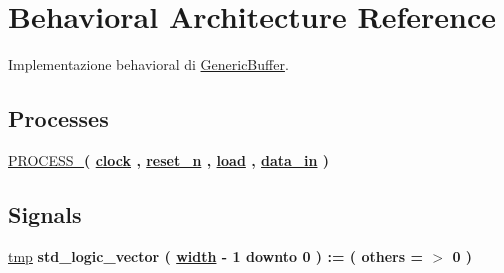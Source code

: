\hypertarget{class_generic_buffer_1_1_behavioral}{}\section{Behavioral Architecture Reference}
\label{class_generic_buffer_1_1_behavioral}


Implementazione behavioral di \hyperlink{class_generic_buffer}{Generic\+Buffer}.  


\subsection*{Processes}
 \begin{DoxyCompactItemize}
\item 
\hyperlink{group___generic_buffer_ga2ee480e118ca2b3fccf26139a66e84ad}{P\+R\+O\+C\+E\+S\+S\+\_}{\bfseries  ( {\bfseries {\bfseries \hyperlink{group___generic_buffer_gadfc2d5e995e9c6876b2e55bf6a5c4071}{clock}} \textcolor{vhdlchar}{ }} , {\bfseries {\bfseries \hyperlink{group___generic_buffer_ga446ea52ed8c4a84181a47d9165ce41a5}{reset\+\_\+n}} \textcolor{vhdlchar}{ }} , {\bfseries {\bfseries \hyperlink{group___generic_buffer_gaba761f7740d0b6257a0e283b3734ddbf}{load}} \textcolor{vhdlchar}{ }} , {\bfseries {\bfseries \hyperlink{group___generic_buffer_ga597910698848749da5951285c85fa4f9}{data\+\_\+in}} \textcolor{vhdlchar}{ }} )}
\end{DoxyCompactItemize}
\subsection*{Signals}
 \begin{DoxyCompactItemize}
\item 
\hyperlink{group___generic_buffer_gab94e66105790803865249c33633e359f}{tmp} {\bfseries \textcolor{vhdlchar}{std\+\_\+logic\+\_\+vector}\textcolor{vhdlchar}{ }\textcolor{vhdlchar}{(}\textcolor{vhdlchar}{ }\textcolor{vhdlchar}{ }\textcolor{vhdlchar}{ }\textcolor{vhdlchar}{ }{\bfseries \hyperlink{group___generic_buffer_gae47d961480346c1d82439a66505e6e7d}{width}} \textcolor{vhdlchar}{-\/}\textcolor{vhdlchar}{ } \textcolor{vhdldigit}{1} \textcolor{vhdlchar}{ }\textcolor{vhdlchar}{downto}\textcolor{vhdlchar}{ }\textcolor{vhdlchar}{ } \textcolor{vhdldigit}{0} \textcolor{vhdlchar}{ }\textcolor{vhdlchar}{)}\textcolor{vhdlchar}{ }\textcolor{vhdlchar}{ }\textcolor{vhdlchar}{ }\textcolor{vhdlchar}{\+:}\textcolor{vhdlchar}{=}\textcolor{vhdlchar}{ }\textcolor{vhdlchar}{(}\textcolor{vhdlchar}{ }\textcolor{vhdlchar}{ }\textcolor{vhdlchar}{others}\textcolor{vhdlchar}{ }\textcolor{vhdlchar}{ }\textcolor{vhdlchar}{=}\textcolor{vhdlchar}{ }\textcolor{vhdlchar}{$>$}\textcolor{vhdlchar}{ }\textcolor{vhdlchar}{\textquotesingle{}}\textcolor{vhdlchar}{ } \textcolor{vhdldigit}{0} \textcolor{vhdlchar}{ }\textcolor{vhdlchar}{\textquotesingle{}}\textcolor{vhdlchar}{ }\textcolor{vhdlchar}{)}\textcolor{vhdlchar}{ }} 
\end{DoxyCompactItemize}



